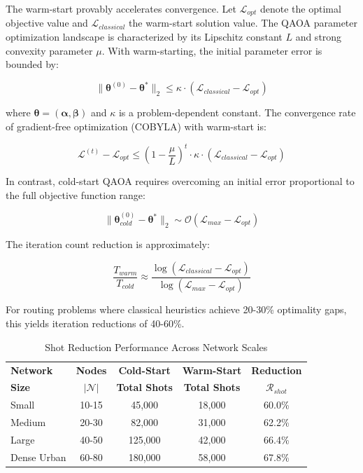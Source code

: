 \documentclass[lettersize,journal]{IEEEtran}
\begin{document}
The warm-start provably accelerates convergence. Let $\mathcal{L}_{opt}$ denote the optimal objective value and $\mathcal{L}_{classical}$ the warm-start solution value. The QAOA parameter optimization landscape is characterized by its Lipschitz constant $L$ and strong convexity parameter $\mu$. With warm-starting, the initial parameter error is bounded by:

\begin{equation}
\|\boldsymbol{\theta}^{(0)} - \boldsymbol{\theta}^*\|_2 \leq \kappa \cdot (\mathcal{L}_{classical} - \mathcal{L}_{opt})
\label{eq:initial_error}
\end{equation}

where $\boldsymbol{\theta} = (\boldsymbol{\alpha}, \boldsymbol{\beta})$ and $\kappa$ is a problem-dependent constant. The convergence rate of gradient-free optimization (COBYLA) with warm-start is:

\begin{equation}
\mathcal{L}^{(t)} - \mathcal{L}_{opt} \leq \left(1 - \frac{\mu}{L}\right)^t \cdot \kappa \cdot (\mathcal{L}_{classical} - \mathcal{L}_{opt})
\label{eq:convergence_rate}
\end{equation}

In contrast, cold-start QAOA requires overcoming an initial error proportional to the full objective function range:

\begin{equation}
\|\boldsymbol{\theta}_{cold}^{(0)} - \boldsymbol{\theta}^*\|_2 \sim \mathcal{O}(\mathcal{L}_{max} - \mathcal{L}_{opt})
\label{eq:cold_start_error}
\end{equation}

The iteration count reduction is approximately:

\begin{equation}
\frac{T_{warm}}{T_{cold}} \approx \frac{\log(\mathcal{L}_{classical} - \mathcal{L}_{opt})}{\log(\mathcal{L}_{max} - \mathcal{L}_{opt})}
\label{eq:iteration_reduction}
\end{equation}

For routing problems where classical heuristics achieve 20-30\% optimality gaps, this yields iteration reductions of 40-60\%.

\begin{table}[t]
\caption{Shot Reduction Performance Across Network Scales}
\label{tab:shot_reduction}
\centering
\small
\begin{tabular}{lcccc}
\hline
\textbf{Network} & \textbf{Nodes} & \textbf{Cold-Start} & \textbf{Warm-Start} & \textbf{Reduction} \\
\textbf{Size} & $|\mathcal{N}|$ & \textbf{Total Shots} & \textbf{Total Shots} & $\mathcal{R}_{shot}$ \\ \hline
Small & 10-15 & 45,000 & 18,000 & 60.0\% \\
Medium & 20-30 & 82,000 & 31,000 & 62.2\% \\
Large & 40-50 & 125,000 & 42,000 & 66.4\% \\
Dense Urban & 60-80 & 180,000 & 58,000 & 67.8\% \\ \hline
\end{tabular}
\end{table}
\end{document}
